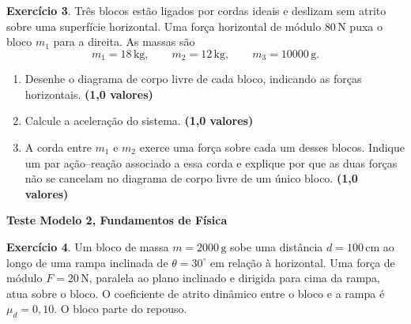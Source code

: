 \documentclass[12pt]{article}
\newcommand{\cabecalho}{
    \hfill
    \begin{minipage}[t]{0.7\textwidth}
        \raggedleft
        \textbf{Teste Modelo 2, Fundamentos de Física}
    \end{minipage}
    \vspace{0.35cm}
}
\newcommand{\pontos}[1]{\hfill\textbf{(#1 valores)}}
\begin{document}
\vspace{0.25cm}

\textbf{Exercício 3}. Três blocos estão ligados por cordas ideais e deslizam sem atrito
sobre uma superfície horizontal. Uma força horizontal de módulo $80\,\text{N}$ puxa o
bloco $m_1$ para a direita. As massas são
\[
m_1=18\,\text{kg}, \qquad m_2=12\,\text{kg}, \qquad m_3=10000\,\text{g}.
\]

\begin{center}
\end{center}

\begin{enumerate}[label=\textbf{\alph*)}]
    \item Desenhe o diagrama de corpo livre de cada bloco, indicando as forças
    horizontais. \pontos{1,0}
    \item Calcule a aceleração do sistema. \pontos{1,0}
    \item A corda entre $m_1$ e $m_2$ exerce uma força sobre cada um desses blocos.
    Indique um par ação--reação associado a essa corda e explique por que as duas forças
    não se cancelam no diagrama de corpo livre de um único bloco. \pontos{1,0}
\end{enumerate}

\newpage

\cabecalho

\textbf{Exercício 4}. Um bloco de massa $m=2000\,\text{g}$ sobe uma distância
$d=100\,\text{cm}$ ao longo de uma rampa inclinada de $\theta=30^\circ$ em relação à
horizontal. Uma força de módulo $F=20\,\text{N}$, paralela ao plano inclinado e dirigida
para cima da rampa, atua sobre o bloco.
O coeficiente de atrito dinâmico entre o bloco e a rampa é $\mu_d=0,10$.
O bloco parte do repouso.
\end{document}
